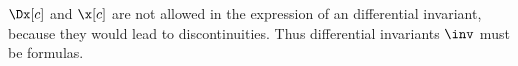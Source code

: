         $\Dx[c]$ and $\x[c]$ are not allowed in the expression of an differential invariant, because they would lead to discontinuities. Thus differential invariants $\inv$ must be \FOLR formulas.









